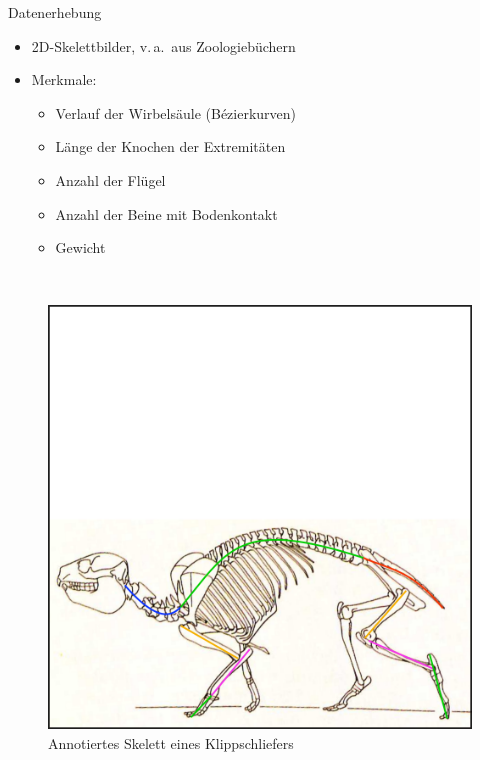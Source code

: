 \documentclass{beamer}
\newcommand{\va}{v.\,a.\ }
\begin{document}
\begin{frame}{Datenerhebung}
 \begin{minipage}{0.5\textwidth}
  \begin{itemize}
   \item 2D-Skelettbilder, \va aus Zoologiebüchern
   \item Merkmale: 
   \begin{itemize}
    \item Verlauf der Wirbelsäule (Bézierkurven)
    \item<2-> Länge der Knochen der Extremitäten
    \item<3-> Anzahl der Flügel
    \item<3-> Anzahl der Beine mit Bodenkontakt
    \item<4-> Gewicht
   \end{itemize}
  \end{itemize}
 \end{minipage}~
 \begin{minipage}{0.5\textwidth}
  \captionsetup{justification=centering}
  \begin{figure}
  \centering
  \includegraphics[width=\textwidth]{../../PCA/Skelettbilder/Klippschliefer_farbig.png}
  \caption{Annotiertes Skelett eines Klippschliefers \cite{Spezielle_Zoologie}}
 \end{figure}
 \end{minipage}
\end{frame}
\end{document}
